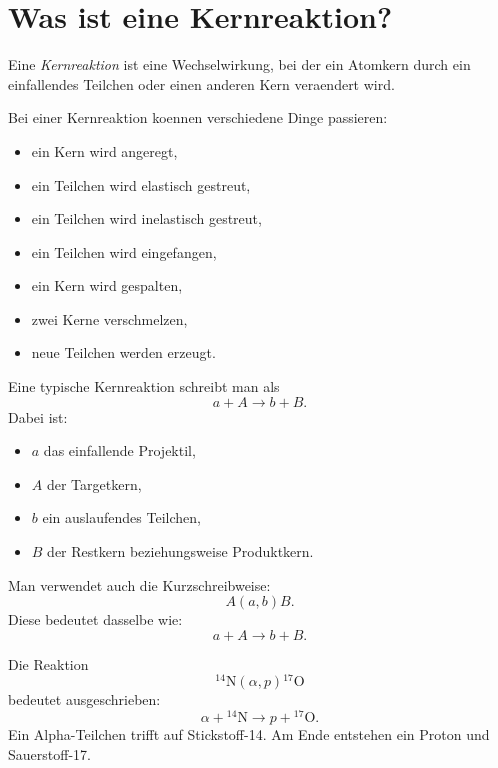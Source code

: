 \section{Was ist eine Kernreaktion?}

\begin{definitionbox}
Eine \emph{Kernreaktion} ist eine Wechselwirkung, bei der ein Atomkern durch ein
einfallendes Teilchen oder einen anderen Kern veraendert wird.
\end{definitionbox}

\begin{conceptbox}
Bei einer Kernreaktion koennen verschiedene Dinge passieren:
\begin{itemize}
    \item ein Kern wird angeregt,
    \item ein Teilchen wird elastisch gestreut,
    \item ein Teilchen wird inelastisch gestreut,
    \item ein Teilchen wird eingefangen,
    \item ein Kern wird gespalten,
    \item zwei Kerne verschmelzen,
    \item neue Teilchen werden erzeugt.
\end{itemize}
\end{conceptbox}

\begin{formulabox}
Eine typische Kernreaktion schreibt man als
\[
    a + A \rightarrow b + B.
\]
Dabei ist:
\begin{itemize}
    \item $a$ das einfallende Projektil,
    \item $A$ der Targetkern,
    \item $b$ ein auslaufendes Teilchen,
    \item $B$ der Restkern beziehungsweise Produktkern.
\end{itemize}
\end{formulabox}

\begin{notebox}
Man verwendet auch die Kurzschreibweise:
\[
    A(a,b)B.
\]
Diese bedeutet dasselbe wie:
\[
    a + A \rightarrow b + B.
\]
\end{notebox}

\begin{examplebox}
Die Reaktion
\[
    {}^{14}\mathrm{N}(\alpha,p){}^{17}\mathrm{O}
\]
bedeutet ausgeschrieben:
\[
    \alpha + {}^{14}\mathrm{N}
    \rightarrow
    p + {}^{17}\mathrm{O}.
\]
Ein Alpha-Teilchen trifft auf Stickstoff-14.
Am Ende entstehen ein Proton und Sauerstoff-17.
\end{examplebox}

